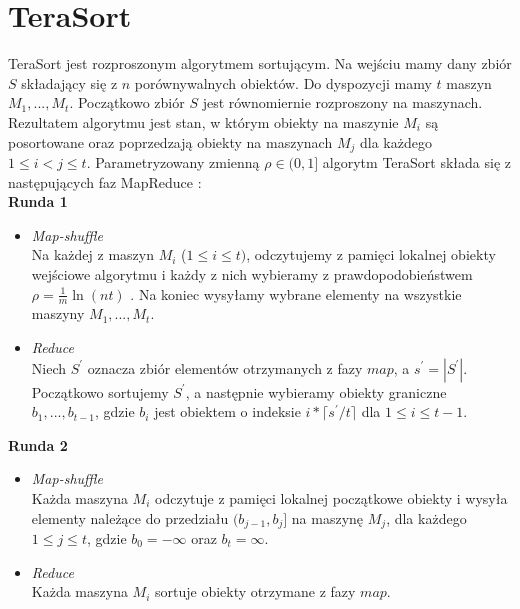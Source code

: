 \documentclass[magisterska]{pracamgr}
\begin{document}
\section{TeraSort} \label{tera_sort}

TeraSort jest rozproszonym algorytmem sortującym. Na wejściu mamy dany zbiór \(S\) składający się z \(n\) porównywalnych obiektów. Do dyspozycji mamy \(t\) maszyn \(M_1, ..., M_t\). Początkowo zbiór \(S\) jest równomiernie rozproszony na maszynach. Rezultatem algorytmu jest stan, w którym obiekty na maszynie \(M_i\) są posortowane oraz poprzedzają obiekty na maszynach \(M_j\) dla każdego \(1 \leq i < j \leq t\). Parametryzowany zmienną \(\rho \in (0, 1]\) algorytm TeraSort składa się z następujących faz MapReduce \cite{tao2013minimal}:\\

\enlargethispage{-\baselineskip}
\enlargethispage{-\baselineskip}
\enlargethispage{-\baselineskip}
\textbf{Runda 1}
\begin{itemize}
    \item \textit{Map-shuffle} \\
    Na każdej z maszyn \(M_i\) (\(1 \leq i \leq t)\), odczytujemy z pamięci lokalnej obiekty wejściowe algorytmu i każdy z nich wybieramy z prawdopodobieństwem \(\rho = \frac{1}{m}\ln(nt)\) \cite{tao2013minimal}. Na koniec wysyłamy wybrane elementy na wszystkie maszyny \(M_1, ..., M_t\).
    \item \textit{Reduce} \\
    Niech \(S^{\prime}\) oznacza zbiór elementów otrzymanych z fazy \(map\), a \(s^{\prime} = |S^{\prime}|\). Początkowo sortujemy \(S^{\prime}\), a następnie wybieramy obiekty graniczne \(b_1, ..., b_{t-1}\), gdzie \(b_i\) jest obiektem o indeksie \(i*\lceil{s^{\prime} / t}\rceil\) dla \(1 \leq i \leq t-1\).
\end{itemize}

\textbf{Runda 2}
\begin{itemize}
    \item \textit{Map-shuffle} \\
    Każda maszyna \(M_i\) odczytuje z pamięci lokalnej początkowe obiekty i wysyła elementy należące do przedziału \((b_{j-1}, b_j]\) na maszynę \(M_j\), dla każdego \(1 \leq j \leq t\), gdzie \(b_0 = -\infty\) oraz \(b_t = \infty\).
    \item \textit{Reduce} \\
    Każda maszyna \(M_i\) sortuje obiekty otrzymane z fazy \(map\).
\end{itemize}
\end{document}
